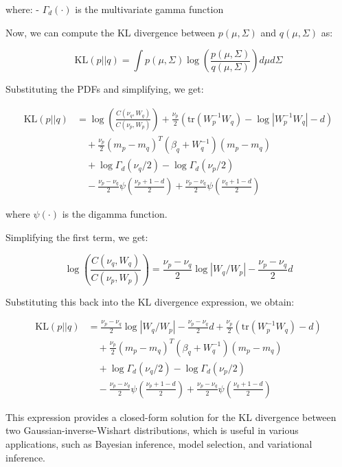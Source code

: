 \documentclass[11pt]{article}
\begin{document}
    where:
    - $\Gamma_d(\cdot)$ is the multivariate gamma function

    Now, we can compute the KL divergence between $p(\mu, \Sigma)$ and $q(\mu, \Sigma)$ as:

    $$\text{KL}(p||q) = \int p(\mu, \Sigma) \log\left(\frac{p(\mu, \Sigma)}{q(\mu, \Sigma)}\right) d\mu d\Sigma$$

    Substituting the PDFs and simplifying, we get:

    \begin{align*}
        \text{KL}(p||q) &= \log\left(\frac{C(\nu_q, W_q)}{C(\nu_p, W_p)}\right) + \frac{\nu_p}{2}\left(\text{tr}(W_p^{-1} W_q) - \log|W_p^{-1} W_q| - d\right) \\
        &\quad + \frac{\nu_p}{2}(m_p - m_q)^T (\beta_q + W_q^{-1}) (m_p - m_q) \\
        &\quad + \log \Gamma_d(\nu_q/2) - \log \Gamma_d(\nu_p/2) \\
        &\quad - \frac{\nu_p - \nu_q}{2} \psi\left(\frac{\nu_p + 1 - d}{2}\right) + \frac{\nu_p - \nu_q}{2} \psi\left(\frac{\nu_q + 1 - d}{2}\right)
    \end{align*}

    where $\psi(\cdot)$ is the digamma function.

    Simplifying the first term, we get:

    $$\log\left(\frac{C(\nu_q, W_q)}{C(\nu_p, W_p)}\right) = \frac{\nu_p - \nu_q}{2} \log|W_q/W_p| - \frac{\nu_p - \nu_q}{2}d$$

    Substituting this back into the KL divergence expression, we obtain:

    \begin{align*}
        \text{KL}(p||q) &= \frac{\nu_p - \nu_q}{2} \log|W_q/W_p| - \frac{\nu_p - \nu_q}{2}d + \frac{\nu_p}{2}\left(\text{tr}(W_p^{-1} W_q) - d\right) \\
        &\quad + \frac{\nu_p}{2}(m_p - m_q)^T (\beta_q + W_q^{-1}) (m_p - m_q) \\
        &\quad + \log \Gamma_d(\nu_q/2) - \log \Gamma_d(\nu_p/2) \\
        &\quad - \frac{\nu_p - \nu_q}{2} \psi\left(\frac{\nu_p + 1 - d}{2}\right) + \frac{\nu_p - \nu_q}{2} \psi\left(\frac{\nu_q + 1 - d}{2}\right)
    \end{align*}

    This expression provides a closed-form solution for the KL divergence between two Gaussian-inverse-Wishart distributions, which is useful in various applications, such as Bayesian inference, model selection, and variational inference.
\end{document}
